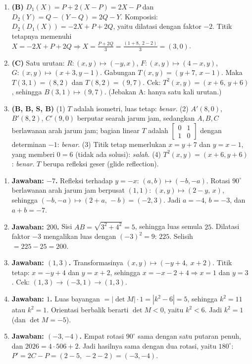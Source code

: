 \documentclass[a4paper,11pt]{article}
\newcommand{\sm}[1]{\left[\begin{smallmatrix}#1\end{smallmatrix}\right]}
\newcounter{no}
\begin{document}
\begin{enumerate}[leftmargin=2em,itemsep=2pt,topsep=2pt]
\item[\textbf{18.}] \textbf{(B)} $D_1(X)=P+2(X-P)=2X-P$ dan $D_2(Y)=Q-(Y-Q)=2Q-Y$. Komposisi: $D_2(D_1(X))=-2X+P+2Q$, yaitu dilatasi dengan faktor $-2$. Titik tetapnya memenuhi $X=-2X+P+2Q\Rightarrow X=\frac{P+2Q}{3}=\frac{(1+8,\;2-2)}{3}=(3,0)$.
\item[\textbf{19.}] \textbf{(C)} Satu urutan: $R:(x,y)\mapsto(-y,x)$, $F:(x,y)\mapsto(4-x,y)$, $G:(x,y)\mapsto(x+3,y-1)$. Gabungan $T(x,y)=(y+7,\,x-1)$. Maka $T(3,1)=(8,2)$ dan $T(8,2)=(9,7)$. Cek: $T^2(x,y)=(x+6,\,y+6)$, sehingga $B(3,1)\mapsto(9,7)$. (Jebakan A: hanya satu kali urutan.)
\item[\textbf{20.}] \textbf{(B, B, S, B)} (1) $T$ adalah isometri, luas tetap: \emph{benar}. (2) $A'(8,0)$, $B'(8,2)$, $C'(9,0)$ berputar searah jarum jam, sedangkan $A,B,C$ berlawanan arah jarum jam; bagian linear $T$ adalah $\sm{0&1\\1&0}$ dengan determinan $-1$: \emph{benar}. (3) Titik tetap memerlukan $x=y+7$ dan $y=x-1$, yang memberi $0=6$ (tidak ada solusi): \emph{salah}. (4) $T^2(x,y)=(x+6,y+6)$: \emph{benar}. $T$ berupa refleksi geser (glide reflection).
\end{enumerate}
\par{}\par\vspace{0.2em}
\small\begin{enumerate}[leftmargin=2em,itemsep=2pt,topsep=2pt]
\item[\textbf{1.}] \textbf{Jawaban: $-7$.} Refleksi terhadap $y=-x$: $(a,b)\mapsto(-b,-a)$. Rotasi $90^\circ$ berlawanan arah jarum jam berpusat $(1,1)$: $(x,y)\mapsto(2-y,\,x)$, sehingga $(-b,-a)\mapsto(2+a,\,-b)=(-2,3)$. Jadi $a=-4$, $b=-3$, dan $a+b=-7$.
\item[\textbf{2.}] \textbf{Jawaban: $200$.} Sisi $AB=\sqrt{3^2+4^2}=5$, sehingga luas semula $25$. Dilatasi faktor $-3$ mengalikan luas dengan $(-3)^2=9$: $225$. Selisih $=225-25=200$.
\item[\textbf{3.}] \textbf{Jawaban: $(1,3)$.} Transformasinya $(x,y)\mapsto(-y+4,\;x+2)$. Titik tetap: $x=-y+4$ dan $y=x+2$, sehingga $x=-x-2+4\Rightarrow x=1$ dan $y=3$. Cek: $(1,3)\to(-3,1)\to(1,3)$.
\item[\textbf{4.}] \textbf{Jawaban: $1$.} Luas bayangan $=|\det M|\cdot1=|k^2-6|=5$, sehingga $k^2=11$ atau $k^2=1$. Orientasi berbalik berarti $\det M<0$, yaitu $k^2<6$. Jadi $k^2=1$ (dan $\det M=-5$).
\item[\textbf{5.}] \textbf{Jawaban: $(-3,-4)$.} Empat rotasi $90^\circ$ sama dengan satu putaran penuh, dan $2026=4\cdot506+2$. Jadi hasilnya sama dengan dua rotasi, yaitu $180^\circ$: $P'=2C-P=(2-5,\,-2-2)=(-3,-4)$.
\end{enumerate}
\end{document}
